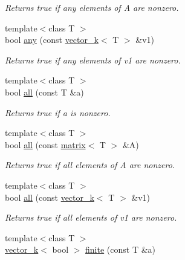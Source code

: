 \begin{DoxyCompactItemize}
\begin{DoxyCompactList}\small\item\em Returns true if any elements of A are nonzero. \end{DoxyCompactList}\item 
\hypertarget{namespacekeycpp_af40fa7667b60f30a3b0912464d382d57}{{\footnotesize template$<$class T $>$ }\\bool \hyperlink{namespacekeycpp_af40fa7667b60f30a3b0912464d382d57}{any} (const \hyperlink{classkeycpp_1_1vector__k}{vector\-\_\-k}$<$ T $>$ \&v1)}\label{namespacekeycpp_af40fa7667b60f30a3b0912464d382d57}

\begin{DoxyCompactList}\small\item\em Returns true if any elements of v1 are nonzero. \end{DoxyCompactList}\item 
\hypertarget{namespacekeycpp_aab77d82d9cc7d1fcca87967048f09e0e}{{\footnotesize template$<$class T $>$ }\\bool \hyperlink{namespacekeycpp_aab77d82d9cc7d1fcca87967048f09e0e}{all} (const T \&a)}\label{namespacekeycpp_aab77d82d9cc7d1fcca87967048f09e0e}

\begin{DoxyCompactList}\small\item\em Returns true if a is nonzero. \end{DoxyCompactList}\item 
\hypertarget{namespacekeycpp_a0ebd51ca90981278382a922c04ee7a75}{{\footnotesize template$<$class T $>$ }\\bool \hyperlink{namespacekeycpp_a0ebd51ca90981278382a922c04ee7a75}{all} (const \hyperlink{classkeycpp_1_1matrix}{matrix}$<$ T $>$ \&A)}\label{namespacekeycpp_a0ebd51ca90981278382a922c04ee7a75}

\begin{DoxyCompactList}\small\item\em Returns true if all elements of A are nonzero. \end{DoxyCompactList}\item 
\hypertarget{namespacekeycpp_a9fe10fe179c6988a6f72e3715197457c}{{\footnotesize template$<$class T $>$ }\\bool \hyperlink{namespacekeycpp_a9fe10fe179c6988a6f72e3715197457c}{all} (const \hyperlink{classkeycpp_1_1vector__k}{vector\-\_\-k}$<$ T $>$ \&v1)}\label{namespacekeycpp_a9fe10fe179c6988a6f72e3715197457c}

\begin{DoxyCompactList}\small\item\em Returns true if all elements of v1 are nonzero. \end{DoxyCompactList}\item 
\hypertarget{namespacekeycpp_a97c154d91210f0af72e5047649ab2fb5}{{\footnotesize template$<$class T $>$ }\\\hyperlink{classkeycpp_1_1vector__k}{vector\-\_\-k}$<$ bool $>$ \hyperlink{namespacekeycpp_a97c154d91210f0af72e5047649ab2fb5}{finite} (const T \&a)}\label{namespacekeycpp_a97c154d91210f0af72e5047649ab2fb5}


\end{DoxyCompactItemize}

